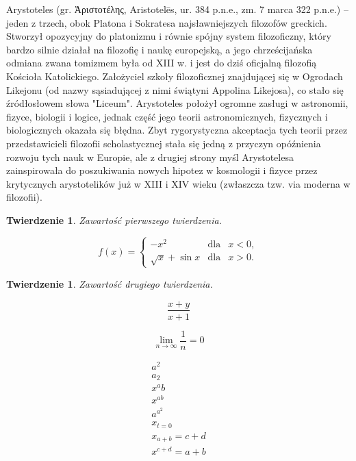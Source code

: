 \documentclass[a4paper,12pt]{article}
\newtheorem{funkcja}{Twierdzenie}
\newtheorem{funkcja2}{Twierdzenie}
\begin{document}
Arystoteles (gr. Ἀριστοτέλης, Aristotelēs, ur. 384 p.n.e., zm. 7 marca 322 p.n.e.) – jeden z trzech, obok Platona i Sokratesa najsławniejszych filozofów greckich. Stworzył opozycyjny do platonizmu i równie spójny system filozoficzny, który bardzo silnie działał na filozofię i naukę europejską, a jego chrześcijańska odmiana zwana tomizmem była od XIII w. i jest do dziś oficjalną filozofią Kościoła Katolickiego. Założyciel szkoły filozoficznej znajdującej się w Ogrodach Likejonu (od nazwy sąsiadującej z nimi świątyni Appolina Likejosa), co stało się źródłosłowem słowa "Liceum". Arystoteles położył ogromne zasługi w astronomii, fizyce, biologii i logice, jednak część jego teorii astronomicznych, fizycznych i biologicznych okazała się błędna. Zbyt rygorystyczna akceptacja tych teorii przez przedstawicieli filozofii scholastycznej stała się jedną z przyczyn opóźnienia rozwoju tych nauk w Europie, ale z drugiej strony myśl Arystotelesa zainspirowała do poszukiwania nowych hipotez w kosmologii i fizyce przez krytycznych arystotelików już w XIII i XIV wieku (zwłaszcza tzw. via moderna w filozofii).

\begin{funkcja}
\label{twr:1}
Zawartość pierwszego twierdzenia.
\end{funkcja}
\begin{equation}
\label{eq:funkcjaf}
f(x) = \left\lbrace
\begin{array}{rcl}
-x^2 & \text{dla} & x < 0,\\
\sqrt{x} + \sin x & \text{dla} & x > 0.
\end{array}
\right.
\end{equation}

\begin{funkcja2}
\label{twr:2}
Zawartość drugiego twierdzenia.
\end{funkcja2}
\begin{equation}
\frac{x + y}{x + 1}
\end{equation}

$$\lim_{n \to \infty} \frac{1}{n}=0$$

\begin{eqnarray}
\label{eq:costam}
a^ 2\\
a_2\\
x^ ab\\
x^ {ab}\nonumber\\
a^ {a^ 2}\\
x_{t=0}\\
x_{a+b}={c+d}\\
x^ {c+d}={a+b}\\
\end{eqnarray}
\end{document}
